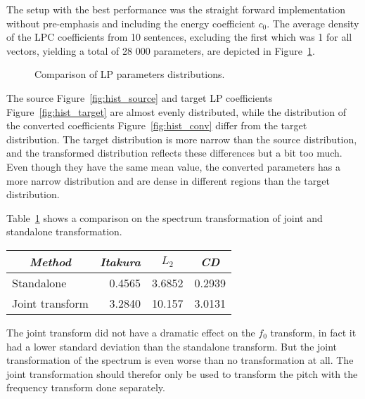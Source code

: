 The setup with the best performance was the straight forward implementation without pre-emphasis and including the energy coefficient $c_0$. The average density of the LPC coefficients from 10 sentences, excluding the first which was 1 for all vectors, yielding a total of 28 000 parameters, are depicted in Figure~\ref{fig:hist_lp}.
\begin{figure}[htbp]
	\begin{center}
	\caption{Comparison of LP parameters distributions.}
	\label{fig:hist_lp}
	\end{center}
\end{figure}
The source Figure~\ref{fig:hist_source} and target LP coefficients Figure~\ref{fig:hist_target} are almost evenly distributed, while the distribution of the converted coefficients Figure~\ref{fig:hist_conv} differ from the target distribution. The target distribution is more narrow than the source distribution, and the transformed distribution reflects these differences but a bit too much. Even though they have the same mean value, the converted parameters has a more narrow distribution and are dense in different regions than the target distribution.

Table~\ref{tab:spectrum_joint_transform} shows a comparison on the spectrum transformation of joint and standalone transformation.
\begin{table}[htbp]
	\begin{center}
		\label{tab:spectrum_joint_transform}
		\begin{tabular}{lrrr}
			\toprule
			\multicolumn{1}{c}{\emph{Method}} & \multicolumn{1}{c}{\emph{Itakura}} & \multicolumn{1}{c}{\emph{$L_2$}} & \multicolumn{1}{c}{\emph{CD}}\\
			\midrule
			Standalone & 0.4565 & 3.6852 & 0.2939 \\
			Joint transform & 3.2840 & 10.157 & 3.0131 \\
			\bottomrule			
		\end{tabular}		
	\end{center}	
\end{table}
The joint transform did not have a dramatic effect on the $f_0$ transform, in fact it had a lower standard deviation than the standalone transform. But the joint transformation of the spectrum is even worse than no transformation at all. The joint transformation should therefor only be used to transform the pitch with the frequency transform done separately.

